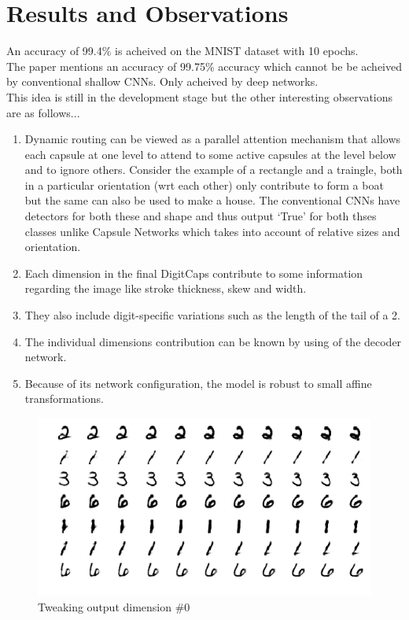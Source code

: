 \documentclass[10pt,twocolumn,letterpaper]{article}
\begin{document}
\section{Results and Observations}
An accuracy of 99.4\% is acheived on the MNIST dataset with 10 epochs.\\
The paper mentions an accuracy of 99.75\% accuracy which cannot be be acheived by conventional shallow CNNs. Only acheived by deep networks.\\
This idea is still in the development stage but the other interesting observations are as follows...
\begin{enumerate}
	\item Dynamic routing can be viewed as a parallel attention mechanism that allows each capsule at one level to attend to some active capsules at the level below and to ignore others. Consider the example of a rectangle and a traingle, both in a particular orientation (wrt each other) only contribute to form a boat but the same can also be used to make a house. The conventional CNNs have detectors for both these and shape and thus output `True' for both thses classes unlike Capsule Networks which takes into account of relative sizes and orientation.
	\item Each dimension in the final DigitCaps contribute to some information regarding the image like stroke thickness, skew and width. 
	\item They also include digit-specific variations such as the length of the tail of a 2.
	\item The individual dimensions contribution can be known by using of the decoder network.
	\item Because of its network configuration, the model is robust to small affine transformations.
\end{enumerate}
\begin{figure}[ht]
	\includegraphics[width=\columnwidth]{j0}
	\caption{Tweaking output dimension \#0}
\end{figure}
\end{document}
